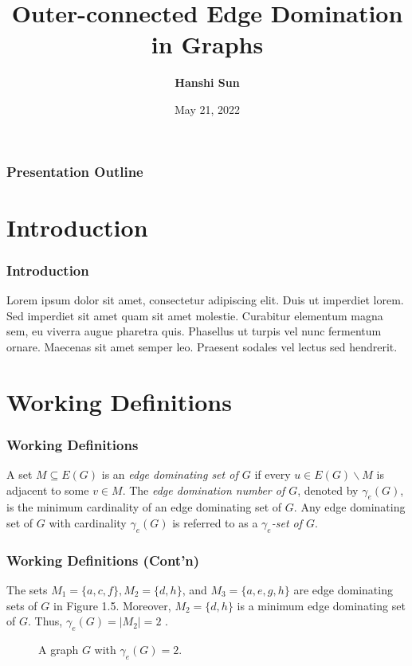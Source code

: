\documentclass{beamer}
\title[Outer-connected Edge Domination in Graphs]{Outer-connected Edge Domination in Graphs}
\author [Hanshi Sun]{\textbf{Hanshi Sun}}
\institute[Southeast University] {
	School of Electronic Science \& Engineering \\ Southeast University\\ \medskip \emph{preminstrel@seu.edu.cn}}
\date{May 21, 2022}
\begin{document}
\begin{frame}{\titlepage}\end{frame}
\begin{frame}{\frametitle{Presentation Outline}\tableofcontents}\end{frame}
\section{Introduction}
\begin{frame}
    \frametitle{Introduction}
    \justifying
    Lorem ipsum dolor sit amet, consectetur adipiscing elit. Duis ut imperdiet lorem. Sed imperdiet sit amet quam sit amet molestie. Curabitur elementum magna sem, eu viverra augue pharetra quis. Phasellus ut turpis vel nunc fermentum ornare. Maecenas sit amet semper leo. Praesent sodales vel lectus sed hendrerit.
\end{frame}
\section{Working Definitions}
\begin{frame}
    \frametitle{Working Definitions}
    \begin{definition}\label{d19} A  set $M \subseteq E(G)$ is an \emph{edge dominating set of $G$} if every $u \in E(G) \backslash M$ is adjacent to some $v \in M$. The \emph{edge domination number of $G$}, denoted by $\gamma_{e}(G)$, is the minimum cardinality of an edge dominating set of $G$. Any edge dominating set of $G$ with cardinality $\gamma_{e}(G)$ is referred to as a \emph{$\gamma_{e}$-set of $G$}.
    \end{definition}
\end{frame}

\begin{frame}
    \frametitle{Working Definitions (Cont'n)}
    \begin{example}
        \justifying
        The sets $M_{1}=\{a, c, f\}, M_{2}=\{d, h\}$, and $M_{3}=\{a, e, g, h\}$ are edge dominating sets of $G$ in Figure 1.5. Moreover, $M_{2}=\{d, h\}$ is a minimum edge dominating set of $G$. Thus, $\gamma_{e}(G)=\left|M_{2}\right|=2$ \cite{arumugam2009connected}.
        \begin{figure}[ht]
            \centering
            \captionsetup{justification=centering}
            \caption{A graph $G$ with $\gamma_{e}(G)=2$.\label{edom}}
        \end{figure}
    \end{example}
\end{frame}
\end{document}
